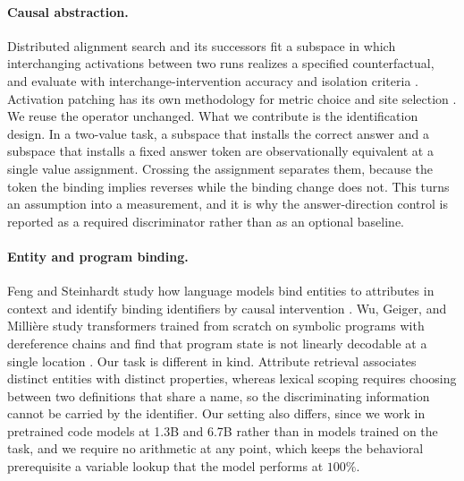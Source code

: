 \documentclass{article}
\begin{document}
\paragraph{Causal abstraction.}
Distributed alignment search and its successors fit a subspace in which interchanging activations between two runs realizes a specified counterfactual, and evaluate with interchange-intervention accuracy and isolation criteria \citep{geiger2023alignments,wu2023boundless,huang2024ravel}. Activation patching has its own methodology for metric choice and site selection \citep{zhang2023patching}. We reuse the operator unchanged. What we contribute is the identification design. In a two-value task, a subspace that installs the correct answer and a subspace that installs a fixed answer token are observationally equivalent at a single value assignment. Crossing the assignment separates them, because the token the binding implies reverses while the binding change does not. This turns an assumption into a measurement, and it is why the answer-direction control is reported as a required discriminator rather than as an optional baseline.

\paragraph{Entity and program binding.}
Feng and Steinhardt study how language models bind entities to attributes in context and identify binding identifiers by causal intervention \citep{feng2024binding}. Wu, Geiger, and Milli\`ere study transformers trained from scratch on symbolic programs with dereference chains and find that program state is not linearly decodable at a single location \citep{wu2025variablebinding}. Our task is different in kind. Attribute retrieval associates distinct entities with distinct properties, whereas lexical scoping requires choosing between two definitions that share a name, so the discriminating information cannot be carried by the identifier. Our setting also differs, since we work in pretrained code models at 1.3B and 6.7B rather than in models trained on the task, and we require no arithmetic at any point, which keeps the behavioral prerequisite a variable lookup that the model performs at $100\%$.
\end{document}
